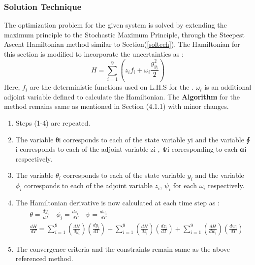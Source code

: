 \documentclass[3p,times,authoryear]{elsarticle}
\begin{document}
\subsubsection{Solution Technique}
The optimization problem for the given system is solved by extending the maximum principle to the Stochastic Maximum Principle\cite{ramirez}, through the Steepest Ascent Hamiltonian method similar to Section(\ref{soltech}).
The Hamiltonian for this section is modified to incorporate the uncertainties as\cite{yenkie} :
\begin{equation}
H = \sum_{i=1}^{9} \left( z_{i}f_{i} + \omega_{i}\frac{g_{y_{i}}^2}{2} \right)
\end{equation}
Here, $f_{i}$ are the deterministic functions used on L.H.S for the . $\omega_{i}$ is an additional adjoint variable defined to calculate the Hamiltonian.
The \textbf{Algorithm} for the method remains same as mentioned in Section (4.1.1) with minor changes.
\begin{enumerate}
\item  Steps (1-4) are repeated. 
\item The variable θi corresponds to each of the state variable yi and the variable ∮ i corresponds to each of the adjoint variable zi , Ψi corresponding to each ωi respectively.
\item The variable $\theta_{i}$ corresponds to each of the state variable $y_{i}$ and the variable $\phi_{i}$ corresponds to each of the adjoint variable $z_{i}$, $\psi_{i}$ for each $\omega_{i}$ respectively.

\item The Hamiltonian derivative is now calculated at each time step  as :
\begin{align}
&\theta = \frac{dy_{i}}{dT} \quad \phi_{i} = \frac{dz_{i}}{dT} \quad \psi = \frac{d\omega_{i}}{dT} \\
&\frac{dH}{dT} = \sum_{i=1}^{9} \left( \frac{dH}{dy_{i}}\right)\left(	\frac{dy_{i}}{dT} \right) + \sum_{i=1}^{9} \left(\frac{dH}{dz_{i}}\right)\left(\frac{dz_{i}}{dT} \right) + \sum_{i=1}^{9} \left(\frac{dH}{dw_{i}}\right)\left(\frac{dw_{i}}{dT} \right)
\end{align}
\item The convergence criteria and the constraints remain same as the above referenced method.
\end{enumerate} 
\end{document}
